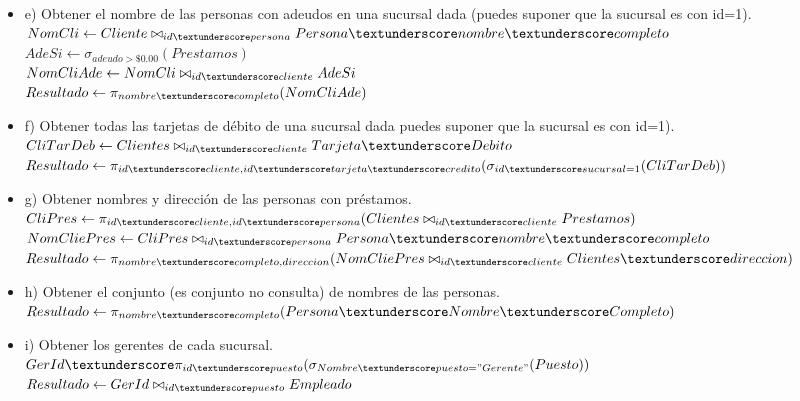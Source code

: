 \documentclass{article}
\begin{document}
\begin{itemize}
\begin{itemize}
        \item e) Obtener el nombre de las personas con adeudos en una sucursal dada (puedes suponer que la sucursal es con id=1). \\
        $NomCli \leftarrow Cliente \bowtie_{id\textunderscore persona} Persona\textunderscore nombre\textunderscore completo$ \\
        $AdeSi \leftarrow \sigma_{adeudo > \$ 0.00} (Prestamos)$ \\
        $NomCliAde \leftarrow NomCli \bowtie_{id\textunderscore cliente} AdeSi$ \\
        $Resultado \leftarrow \pi_{nombre\textunderscore completo} (NomCliAde)$ \\

        \item f) Obtener todas las tarjetas de débito de una sucursal dada puedes suponer que la sucursal es con id=1). \\
        $CliTarDeb \leftarrow Clientes \bowtie_{id\textunderscore cliente} Tarjeta\textunderscore Debito$ \\
        $Resultado \leftarrow \pi_{id\textunderscore cliente, id\textunderscore tarjeta\textunderscore credito} (\sigma_{id\textunderscore sucursal = 1} (CliTarDeb))$ \\

        \item g) Obtener nombres y dirección de las personas con préstamos. \\
        $CliPres \leftarrow \pi_{id\textunderscore cliente, id\textunderscore persona} (Clientes \bowtie_{id\textunderscore cliente} Prestamos)$ \\
        $NomCliePres \leftarrow CliPres \bowtie_{id\textunderscore persona} Persona\textunderscore nombre\textunderscore completo$ \\
        $Resultado \leftarrow \pi_{nombre\textunderscore completo, direccion} (NomCliePres \bowtie_{id\textunderscore cliente} Clientes\textunderscore direccion)$ \\

        \item h) Obtener el conjunto (es conjunto no consulta) de nombres de las personas. \\
        $Resultado \leftarrow \pi_{nombre\textunderscore completo} (Persona\textunderscore Nombre\textunderscore Completo)$ \\

        \item i) Obtener los gerentes de cada sucursal. \\
        $GerId \textunderscore \pi_{id\textunderscore puesto} (\sigma_{Nombre\textunderscore puesto = "Gerente"} (Puesto))$ \\
        $Resultado \leftarrow GerId \bowtie_{id\textunderscore puesto} Empleado$ \\


\end{itemize}
\end{itemize}
\end{document}
